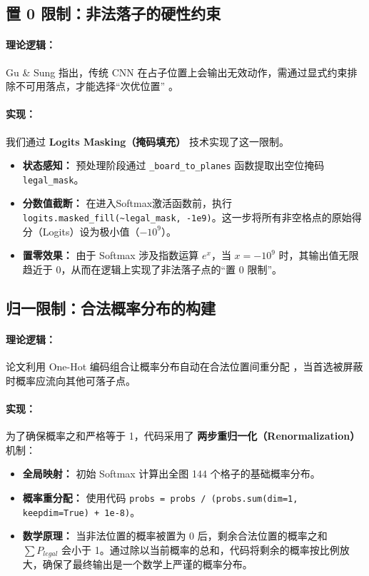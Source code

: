 \documentclass{article}
\begin{document}
\subsection{置 0 限制：非法落子的硬性约束}

\paragraph{理论逻辑：} 
Gu \& Sung 指出，传统 CNN 在占子位置上会输出无效动作，需通过显式约束排除不可用落点，才能选择“次优位置” \citep{gu2021onehot}。

\paragraph{实现：} 
我们通过 \textbf{Logits Masking（掩码填充）} 技术实现了这一限制。
\begin{itemize}
    \item \textbf{状态感知：} 预处理阶段通过 \texttt{\_board\_to\_planes} 函数提取出空位掩码 \texttt{legal\_mask}。
    \item \textbf{分数值截断：} 在进入Softmax激活函数前，执行 \texttt{logits.masked\_fill(\textasciitilde legal\_mask, -1e9)}。这一步将所有非空格点的原始得分（Logits）设为极小值（$-10^9$）。
    \item \textbf{置零效果：} 由于 Softmax 涉及指数运算 $e^x$，当 $x = -10^9$ 时，其输出值无限趋近于 0，从而在逻辑上实现了非法落子点的“置 0 限制”。
\end{itemize}

\subsection{归一限制：合法概率分布的构建}

\paragraph{理论逻辑：} 
论文利用 One-Hot 编码组合让概率分布自动在合法位置间重分配 \citep{gu2021onehot}，当首选被屏蔽时概率应流向其他可落子点。

\paragraph{实现：} 
为了确保概率之和严格等于 1，代码采用了 \textbf{两步重归一化（Renormalization）} 机制：
\begin{itemize}
    \item \textbf{全局映射：} 初始 Softmax 计算出全图 144 个格子的基础概率分布。
    \item \textbf{概率重分配：} 使用代码 \texttt{probs = probs / (probs.sum(dim=1, keepdim=True) + 1e-8)}。
    \item \textbf{数学原理：} 当非法位置的概率被置为 0 后，剩余合法位置的概率之和 $\sum P_{legal}$ 会小于 1。通过除以当前概率的总和，代码将剩余的概率按比例放大，确保了最终输出是一个数学上严谨的概率分布。
\end{itemize}
\end{document}
